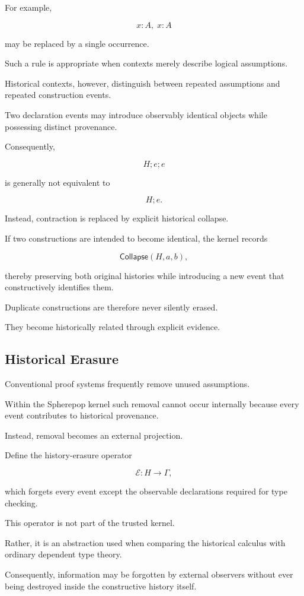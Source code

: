 \documentclass[12pt,oneside]{article}
\theoremstyle{definition}
\theoremstyle{remark}
\newcommand{\Collapse}{\mathsf{Collapse}}
\newcommand{\erase}{\mathcal{E}}
\begin{document}
For example,

\[
x:A,
\;
x:A
\]

may be replaced by a single occurrence.

Such a rule is appropriate when contexts merely describe logical assumptions.

Historical contexts, however, distinguish between repeated assumptions and
repeated construction events.

Two declaration events may introduce observably identical objects while
possessing distinct provenance.

Consequently,

\[
H;
e;
e
\]

is generally not equivalent to

\[
H;
e.
\]

Instead, contraction is replaced by explicit historical collapse.

If two constructions are intended to become identical, the kernel records

\[
\Collapse(H,a,b),
\]

thereby preserving both original histories while introducing a new event that
constructively identifies them.

Duplicate constructions are therefore never silently erased.

They become historically related through explicit evidence.

\subsection{Historical Erasure}

Conventional proof systems frequently remove unused assumptions.

Within the Spherepop kernel such removal cannot occur internally because every
event contributes to historical provenance.

Instead, removal becomes an external projection.

Define the history-erasure operator

\[
\erase
:
H
\rightarrow
\Gamma,
\]

which forgets every event except the observable declarations required for type
checking.

This operator is not part of the trusted kernel.

Rather, it is an abstraction used when comparing the historical calculus with
ordinary dependent type theory.

Consequently, information may be forgotten by external observers without ever
being destroyed inside the constructive history itself.
\end{document}
